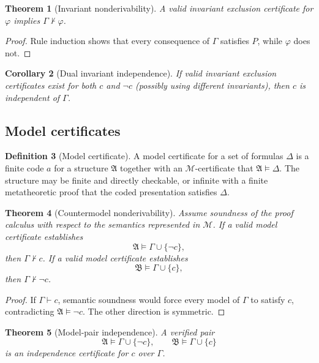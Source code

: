 \documentclass[11pt]{article}
\newtheorem{theorem}{Theorem}[section]
\newtheorem{corollary}[theorem]{Corollary}
\theoremstyle{definition}
\newtheorem{definition}[theorem]{Definition}
\theoremstyle{remark}
\newcommand{\M}{\mathcal M}
\newcommand{\Gammaa}{\Gamma}
\begin{document}
\begin{theorem}[Invariant nonderivability]
A valid invariant exclusion certificate for $\varphi$ implies $\Gammaa\nvdash\varphi$.
\end{theorem}

\begin{proof}
Rule induction shows that every consequence of $\Gammaa$ satisfies $P$, while $\varphi$ does not.
\end{proof}

\begin{corollary}[Dual invariant independence]
If valid invariant exclusion certificates exist for both $c$ and $\neg c$ (possibly using different invariants), then $c$ is independent of $\Gammaa$.
\end{corollary}

\subsection{Model certificates}
\begin{definition}[Model certificate]
A model certificate for a set of formulas $\Delta$ is a finite code $a$ for a structure $\mathfrak A$ together with an $\M$-certificate that $\mathfrak A\models\Delta$. The structure may be finite and directly checkable, or infinite with a finite metatheoretic proof that the coded presentation satisfies $\Delta$.
\end{definition}

\begin{theorem}[Countermodel nonderivability]
Assume soundness of the proof calculus with respect to the semantics represented in $\M$. If a valid model certificate establishes
\[
\mathfrak A\models\Gammaa\cup\{\neg c\},
\]
then $\Gammaa\nvdash c$. If a valid model certificate establishes
\[
\mathfrak B\models\Gammaa\cup\{c\},
\]
then $\Gammaa\nvdash\neg c$.
\end{theorem}

\begin{proof}
If $\Gammaa\vdash c$, semantic soundness would force every model of $\Gammaa$ to satisfy $c$, contradicting $\mathfrak A\models\neg c$. The other direction is symmetric.
\end{proof}

\begin{theorem}[Model-pair independence]
A verified pair
\[
\mathfrak A\models\Gammaa\cup\{\neg c\},
\qquad
\mathfrak B\models\Gammaa\cup\{c\}
\]
is an independence certificate for $c$ over $\Gammaa$.
\end{theorem}
\end{document}
